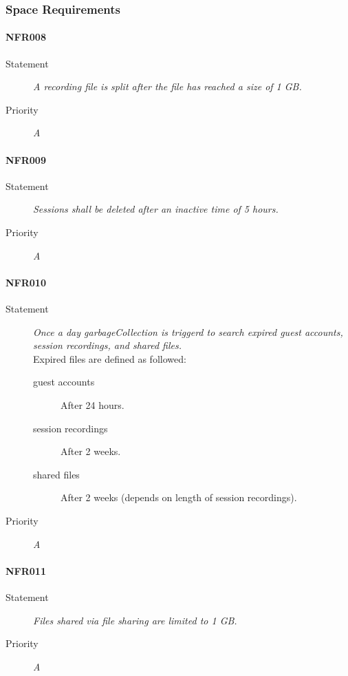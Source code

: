 \subsubsection{Space Requirements}

\paragraph{NFR008}
\begin{description}
\item[Statement] \textit{A recording file is split after the file has reached
    a size of 1 GB.}
\item[Priority] \textit{A}
\end{description}

\paragraph{NFR009}
\begin{description}
\item[Statement] \textit{Sessions shall be deleted after an inactive time of 5
    hours.}
\item[Priority] \textit{A}
\end{description}

\paragraph{NFR010}
\begin{description}
\item[Statement] \textit{Once a day \gls{garbageCollection} is triggerd to
    search expired guest accounts, session recordings, and shared files.}\\
  Expired files are defined as followed:
  \begin{description}
  \item[guest accounts] After 24 hours.
  \item[session recordings] After 2 weeks.
  \item[shared files] After 2 weeks (depends on length of session recordings).
  \end{description}
\item[Priority] \textit{A}
\end{description}

\paragraph{NFR011}
\begin{description}
\item[Statement] \textit{Files shared via file sharing are limited to 1 GB.}
\item[Priority] \textit{A}
\end{description}